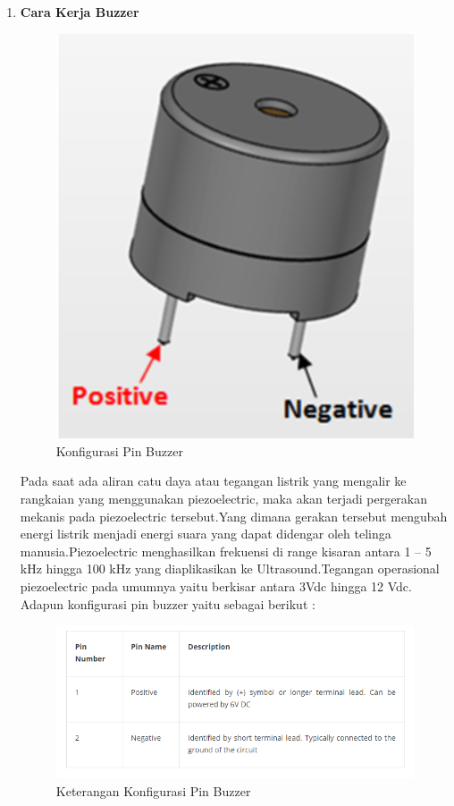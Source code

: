\begin{enumerate}
\item \textbf{Cara Kerja Buzzer }
\begin{figure}[H]
\centering
\includegraphics[width=1\textwidth]{figures/buzzer2.png}
\caption{Konfigurasi Pin Buzzer}
\label{print}
\end{figure}
\par Pada saat ada aliran catu daya atau tegangan listrik yang mengalir ke rangkaian yang menggunakan piezoelectric, maka akan terjadi pergerakan mekanis pada piezoelectric tersebut.Yang dimana gerakan tersebut mengubah energi listrik menjadi energi suara yang dapat didengar oleh telinga manusia.Piezoelectric menghasilkan frekuensi di range kisaran antara 1 – 5 kHz hingga 100 kHz yang diaplikasikan ke Ultrasound.Tegangan operasional piezoelectric pada umumnya yaitu berkisar antara 3Vdc hingga 12 Vdc. Adapun konfigurasi pin buzzer yaitu sebagai berikut :

\begin{figure}[H]
\centering
\includegraphics[width=1\textwidth]{figures/buzzer3.png}
\caption{Keterangan Konfigurasi Pin Buzzer}
\label{print}
\end{figure}


\end{enumerate}

